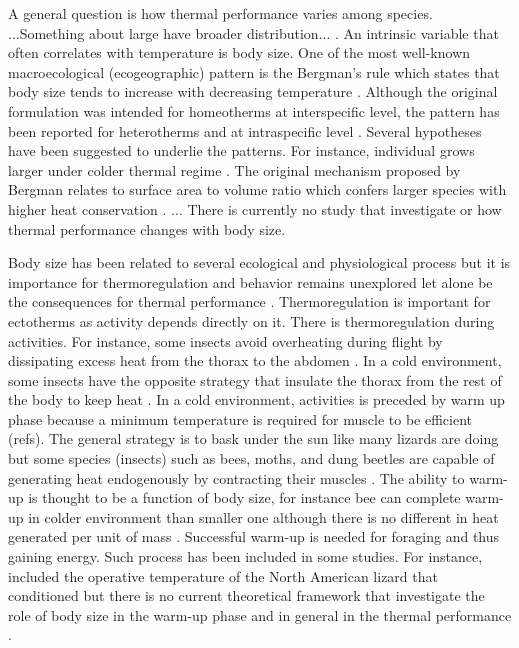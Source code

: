 A general question is how thermal performance varies among species.
...Something about large have broader distribution... \citep{Lumaret1996}.
An intrinsic variable that often correlates with temperature is body size.
One of the most well-known macroecological (ecogeographic) pattern is the Bergman's rule which states that body size tends to increase with decreasing temperature \citep{Bergman1847}. 
Although the original formulation was intended for homeotherms at interspecific level, the pattern has been reported for heterotherms and at intraspecific level \citep{Blackburn1999}.
Several hypotheses have been suggested to underlie the patterns.
For instance, individual grows larger under colder thermal regime \citep{Van1996}.
The original mechanism proposed by Bergman relates to surface area to volume ratio which confers larger species with higher heat conservation \citep{Blackburn1999}.
...
There is currently no study that investigate or how thermal performance changes with body size.

Body size has been related to several ecological and physiological process but it is importance for thermoregulation and behavior remains unexplored let alone be the consequences for thermal performance \citep{Dial2008}.
Thermoregulation  is important for ectotherms as activity depends directly on it.
There is thermoregulation during activities.
For instance, some insects avoid overheating during flight by dissipating excess heat from the thorax to the abdomen \citep{Verdu2012}.
In a cold environment, some insects have the opposite strategy that insulate the thorax from the rest of the body to keep heat \citep{Verdu2012}.
In a cold environment, activities is  preceded by warm up phase because a minimum temperature is required for muscle to be efficient (refs).
The general strategy is to bask under the sun like many lizards are doing but some species (insects) such as bees, moths, and dung beetles are capable of generating heat endogenously by contracting their muscles \citep{Heinrich1975, Bartholomew1978, Bartholomew1981}.
The ability to warm-up is thought to be a function of body size, for instance  bee can complete warm-up in colder environment than smaller one although there is no different in heat generated per unit of mass \citep{Kammer1974, Heinrich1975}.
Successful warm-up is needed for foraging and thus gaining energy.
Such process has been included in some studies.
For instance, \citet{Buckley2008} included the operative temperature of the North American lizard that conditioned but there is no current theoretical framework that investigate the role of body size in the warm-up phase and in general in the thermal performance \citep{Dial2008}.

